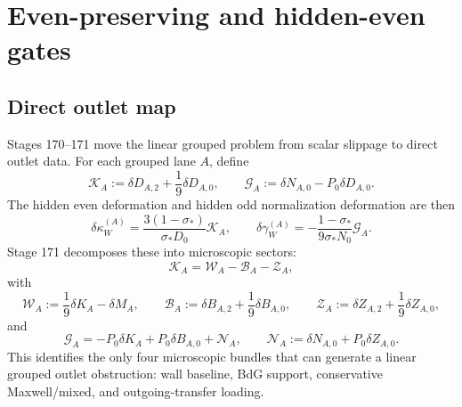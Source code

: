 \section{Even-preserving and hidden-even gates}
\label{sec:app-part05_weak_axisymmetric_orbit:even-preserving-and-hidden-even-gates}

\subsection{Direct outlet map}
Stages 170--171 move the linear grouped problem from scalar slippage to direct outlet data.  For each grouped lane \(A\), define
\begin{equation}
\label{eq:app-part05-KG-defs-section}
\mathcal K_A:=\delta D_{A,2}+\frac19\delta D_{A,0},
\qquad
\mathcal G_A:=\delta N_{A,0}-P_0\delta D_{A,0}.
\end{equation}
The hidden even deformation and hidden odd normalization deformation are then
\begin{equation}
\label{eq:app-part05-dk-dg-outlet}
\delta\kappa_W^{(A)}
=
\frac{3(1-\sigma_*)}{\sigma_*D_0}\mathcal K_A,
\qquad
\delta\gamma_W^{(A)}
=-\frac{1-\sigma_*}{9\sigma_*N_0}\mathcal G_A.
\end{equation}
Stage 171 decomposes these into microscopic sectors:
\begin{equation}
\label{eq:app-part05-K-decomp}
\mathcal K_A
=
\mathcal W_A-\mathcal B_A-\mathcal Z_A,
\end{equation}
with
\begin{equation}
\label{eq:app-part05-WBZ-defs}
\mathcal W_A:=\frac19\delta K_A-\delta M_A,
\qquad
\mathcal B_A:=\delta B_{A,2}+\frac19\delta B_{A,0},
\qquad
\mathcal Z_A:=\delta Z_{A,2}+\frac19\delta Z_{A,0},
\end{equation}
and
\begin{equation}
\label{eq:app-part05-G-decomp}
\mathcal G_A
=
-P_0\delta K_A+P_0\delta B_{A,0}+\mathcal N_A,
\qquad
\mathcal N_A:=\delta N_{A,0}+P_0\delta Z_{A,0}.
\end{equation}
This identifies the only four microscopic bundles that can generate a linear grouped outlet obstruction: wall baseline, BdG support, conservative Maxwell/mixed, and outgoing-transfer loading.

